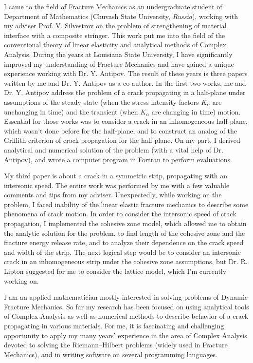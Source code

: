 \documentclass[11pt]{amsart}
\begin{document}
I came to the field of Fracture Mechanics as an undergraduate student of Department of Mathematics (Chuvash State University, \emph{Russia}), working with my adviser Prof. V. Silvestrov on the problem of strengthening of material interface with a composite stringer. This work put me into the field of the conventional theory of linear elasticity and analytical methods of Complex Analysis. During the years at Louisiana State University, I have significantly improved my understanding of Fracture Mechanics and have gained a unique experience working with Dr. Y. Antipov. The result of these years is three papers written by me and Dr. Y. Antipov as a co-author. In the first two works, me and Dr. Y. Antipov address the problem of a crack propagating in a half-plane under assumptions of the steady-state (when the stress intensity factors $K_\alpha$ are unchanging in time) and the transient (when $K_\alpha$ are changing in time) motion. Essential for those works was to consider a crack in an inhomogeneous half-plane, which wasn't done before for the half-plane, and to construct an analog of the Griffith criterion of crack propagation for the half-plane. On my part, I derived analytical and numerical solution of the problem (with a vital help of Dr. Antipov), and wrote a computer program in Fortran to perform evaluations.

My third paper is about a crack in a symmetric strip, propagating with an intersonic speed. The entire work was performed by me with a few valuable comments and tips from my adviser. Unexpectedly, while working on the problem, I faced inability of the linear elastic fracture mechanics to describe some phenomena of crack motion. In order to consider the intersonic speed of crack propagation, I implemented the cohesive zone model, which allowed me to obtain the analytic solution for the problem, to find length of the cohesive zone and the fracture energy release rate, and to analyze their dependence on the crack speed and width of the strip. The next logical step would be to consider an intersonic crack in an inhomogeneous strip under the cohesive zone assumptions, but Dr. R. Lipton suggested for me to consider the lattice model, which I'm currently working on.

\bigskip

I am an applied mathematician mostly interested in solving problems of Dynamic Fracture Mechanics. So far my research has been focused on using analytical tools of Complex Analysis as well as numerical methods to describe behavior of a crack propagating in various materials. For me, it is fascinating and challenging opportunity to apply my many years' experience in the area of Complex Analysis devoted to solving the Riemann--Hilbert problems (widely used in Fracture Mechanics), and in writing software on several programming languages.
\end{document}
